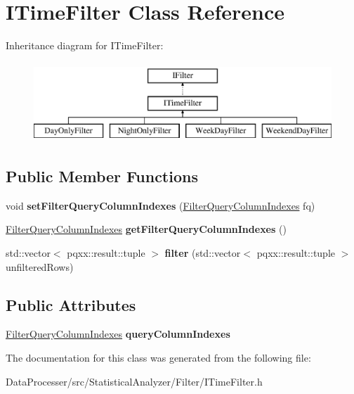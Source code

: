 \hypertarget{classITimeFilter}{}\section{I\+Time\+Filter Class Reference}
\label{classITimeFilter}
Inheritance diagram for I\+Time\+Filter\+:\begin{figure}[H]
\begin{center}
\leavevmode
\includegraphics[height=3.000000cm]{classITimeFilter}
\end{center}
\end{figure}
\subsection*{Public Member Functions}
\begin{DoxyCompactItemize}
\item 
\mbox{\label{classITimeFilter_ab4eaa567bbbc24f5ad60d098cb1e8f42}} 
void {\bfseries set\+Filter\+Query\+Column\+Indexes} (\hyperlink{structFilterQueryColumnIndexes}{Filter\+Query\+Column\+Indexes} fq)
\item 
\mbox{\label{classITimeFilter_a5f9b872405149c0ae2f02b0e25501ea3}} 
\hyperlink{structFilterQueryColumnIndexes}{Filter\+Query\+Column\+Indexes} {\bfseries get\+Filter\+Query\+Column\+Indexes} ()
\item 
\mbox{\label{classITimeFilter_aaeb17cef644e35b7bf9d60d26f9fafd6}} 
std\+::vector$<$ pqxx\+::result\+::tuple $>$ {\bfseries filter} (std\+::vector$<$ pqxx\+::result\+::tuple $>$ unfiltered\+Rows)
\end{DoxyCompactItemize}
\subsection*{Public Attributes}
\begin{DoxyCompactItemize}
\item 
\mbox{\label{classITimeFilter_a2b63e7e266780304d49e971ae7bc4591}} 
\hyperlink{structFilterQueryColumnIndexes}{Filter\+Query\+Column\+Indexes} {\bfseries query\+Column\+Indexes}
\end{DoxyCompactItemize}


The documentation for this class was generated from the following file\+:\begin{DoxyCompactItemize}
\item 
Data\+Processer/src/\+Statistical\+Analyzer/\+Filter/I\+Time\+Filter.\+h\end{DoxyCompactItemize}
